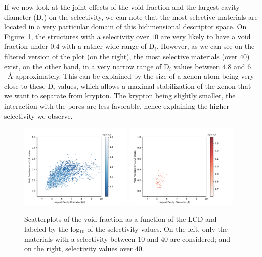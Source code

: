\documentclass[main.tex]{subfiles}
\begin{document}
If we now look at the joint effects of the void fraction and the largest cavity diameter (D$_i$) on the selectivity, we can note that the most selective materials are located in a very particular domain of this bidimensional descriptor space. On Figure~\ref{fgr:lcd_vf}, the structures with a selectivity over $10$ are very likely to have a void fraction under $0.4$ with a rather wide range of D$_i$. However, as we can see on the filtered version of the plot (on the right), the most selective materials (over $40$) exist, on the other hand, in a very narrow range of D$_i$ values between $4.8$ and $6$~\si{\angstrom} approximately. This can be explained by the size of a xenon atom being very close to these D$_i$ values, which allows a maximal stabilization of the xenon that we want to separate from krypton. The krypton being slightly smaller, the interaction with the pores are less favorable, hence explaining the higher selectivity we observe. 

\begin{figure}[h!]
  \centering
  \includegraphics[width=0.48\textwidth]{figures/2-thermo/Scatterplot_vf_lcd_selectivity.pdf}
  \includegraphics[width=0.48\textwidth]{figures/2-thermo/Scatterplot_vf_lcd_selectivity_zoom.pdf}  
  \caption{Scatterplots of the void fraction as a function of the LCD and labeled by the log$_{10}$ of the selectivity values. On the left, only the materials with a selectivity between $10$ and $40$ are considered; and on the right, selectivity values over $40$.}\label{fgr:lcd_vf}
\end{figure}
\end{document}
